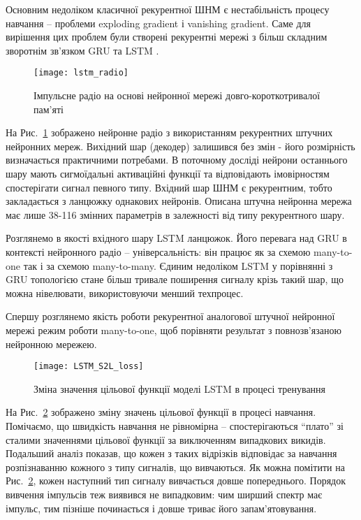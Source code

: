 Основним недоліком класичної рекурентної ШНМ є нестабільність процесу 
навчання -- проблеми exploding gradient і vanishing gradient. Саме для 
вирішення цих проблем були створені рекурентні мережі з більш складним 
зворотнім зв'язком GRU та LSTM \cite{imp:Hochreiter1997}.

\begin{figure}[htbp] \begin{center}
\texttt{[image: lstm\_radio]}
\caption{Імпульсне радіо на основі нейронної мережі 
довго-короткотривалої пам'яті} \label{fig:lstm_radio}
\end{center} \end{figure}

На Рис.~\ref{fig:lstm_radio} зображено нейронне радіо з використанням 
рекурентних штучних нейронних мереж. Вихідний шар (декодер) залишився без 
змін - його розмірність визначається практичними потребами. В поточному 
досліді нейрони останнього шару мають сигмоїдальні активаційні функції 
та відповідають імовірностям спостерігати сигнал певного типу. Вхідний 
шар ШНМ є рекурентним, тобто закладається з ланцюжку однакових нейронів.
Описана штучна нейронна мережа має лише 38-116 змінних параметрів в 
залежності від типу рекурентного шару.

Розглянемо в якості вхідного шару LSTM ланцюжок. Його перевага над 
GRU в контексті нейронного радіо -- універсальність: він працює як за схемою
many-to-one так і за схемою many-to-many. Єдиним недоліком LSTM у порівнянні 
з GRU топологією стане більш тривале поширення сигналу крізь такий шар,
що можна нівелювати, використовуючи менший техпроцес.

Спершу розглянемо якість роботи рекурентної аналогової штучної нейронної 
мережі режим роботи many-to-one, щоб порівняти результат з повнозв'язаною 
нейронною мережею.

\begin{figure}[htbp] \begin{center}
\texttt{[image: LSTM\_S2L\_loss]}
\caption{Зміна значення цільової функції моделі LSTM 
в процесі тренування} \label{fig:lstm_loss}
\end{center} \end{figure}

На Рис.~\ref{fig:lstm_loss} зображено зміну значень цільової функції в процесі
навчання. Помічаємо, що швидкість навчання 
не рівномірна -- спостерігаються ``плато'' зі сталими значеннями цільової 
функції за виключенням випадкових викидів. Подальший аналіз показав, 
що кожен з таких відрізків відповідає за навчання розпізнаванню кожного з 
типу сигналів, що вивчаються. Як можна помітити на Рис.~\ref{fig:lstm_loss},
кожен наступний тип сигналу вивчається довше попереднього. Порядок вивчення 
імпульсів теж виявився не випадковим: чим ширший спектр має імпульс, тим  
пізніше починається і довше триває його запам'ятовування.

